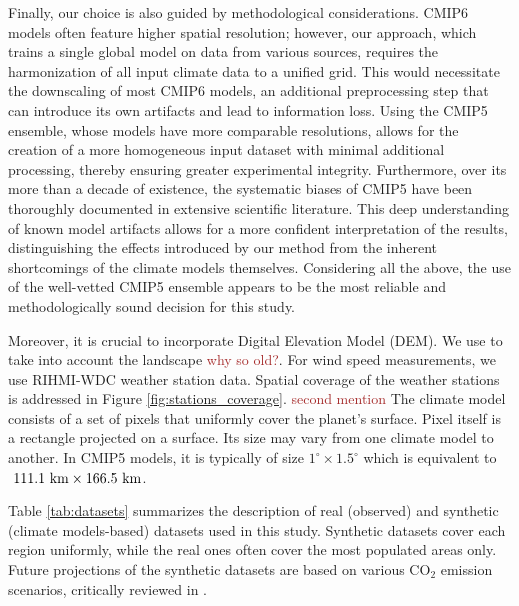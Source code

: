 \documentclass{article}
\begin{document}
Finally, our choice is also guided by methodological considerations. CMIP6 models often feature higher spatial resolution; however, our approach, which trains a single global model on data from various sources, requires the harmonization of all input climate data to a unified grid. This would necessitate the downscaling of most CMIP6 models, an additional preprocessing step that can introduce its own artifacts and lead to information loss. Using the CMIP5 ensemble, whose models have more comparable resolutions, allows for the creation of a more homogeneous input dataset with minimal additional processing, thereby ensuring greater experimental integrity. Furthermore, over its more than a decade of existence, the systematic biases of CMIP5 have been thoroughly documented in extensive scientific literature. This deep understanding of known model artifacts allows for a more confident interpretation of the results, distinguishing the effects introduced by our method from the inherent shortcomings of the climate models themselves. Considering all the above, the use of the well-vetted CMIP5 ensemble appears to be the most reliable and methodologically sound decision for this study.


Moreover, it is crucial to incorporate Digital Elevation Model (DEM). We use \cite{hastings1998development} to take into account the landscape \textcolor{brown}{why so old?}.
For wind speed measurements, we use RIHMI-WDC \cite{Roshydromet} weather station data. Spatial coverage of the weather stations is addressed in Figure \ref{fig:stations_coverage}. \textcolor{brown}{second mention}
The climate model consists of a set of pixels that uniformly cover the planet's surface. Pixel itself is a rectangle projected on a surface. Its size may vary from one climate model to another. In CMIP5 models, it is typically of size $1^\circ \times 1.5^\circ$ which is equivalent to $~111.1 \textup{ km} \times 166.5 \textup{ km}$.


Table \ref{tab:datasets} summarizes the description of real (observed) and synthetic (climate models-based) datasets used in this study. Synthetic datasets cover each region uniformly, while the real ones often cover the most populated areas only. Future projections of the synthetic datasets are based on various CO${}_2$ emission scenarios, critically reviewed in \cite{eyring2016overview}.
\end{document}
